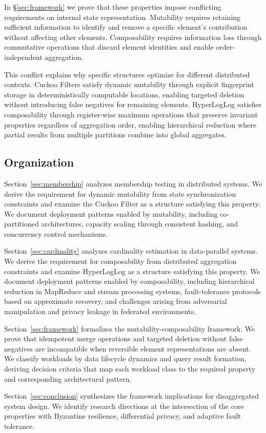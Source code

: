 In \S\ref{sec:framework} we prove that these properties impose conflicting requirements on internal state representation. Mutability requires retaining sufficient information to identify and remove a specific element's contribution without affecting other elements. Composability requires information loss through commutative operations that discard element identities and enable order-independent aggregation.

This conflict explains why specific structures optimize for different distributed contexts. Cuckoo Filters satisfy dynamic mutability through explicit fingerprint storage in deterministically computable locations, enabling targeted deletion without introducing false negatives for remaining elements. HyperLogLog satisfies composability through register-wise maximum operations that preserve invariant properties regardless of aggregation order, enabling hierarchical reduction where partial results from multiple partitions combine into global aggregates.

\subsection{Organization}

Section~\ref{sec:membership} analyzes membership testing in distributed systems. We derive the requirement for dynamic mutability from state synchronization constraints and examine the Cuckoo Filter as a structure satisfying this property. We document deployment patterns enabled by mutability, including co-partitioned architectures, capacity scaling through consistent hashing, and concurrency control mechanisms.

Section~\ref{sec:cardinality} analyzes cardinality estimation in data-parallel systems. We derive the requirement for composability from distributed aggregation constraints and examine HyperLogLog as a structure satisfying this property. We document deployment patterns enabled by composability, including hierarchical reduction in MapReduce and stream processing systems, fault-tolerance protocols based on approximate recovery, and challenges arising from adversarial manipulation and privacy leakage in federated environments.

Section~\ref{sec:framework} formalizes the mutability-composability framework. We prove that idempotent merge operations and targeted deletion without false negatives are incompatible when reversible element representations are absent. We classify workloads by data lifecycle dynamics and query result formation, deriving decision criteria that map each workload class to the required property and corresponding architectural pattern.

Section~\ref{sec:conclusion} synthesizes the framework implications for disaggregated system design. We identify research directions at the intersection of the core properties with Byzantine resilience, differential privacy, and adaptive fault tolerance.
